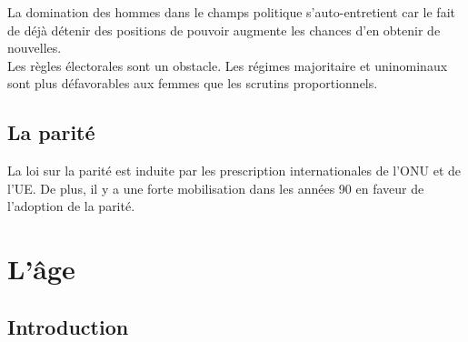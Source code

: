 \documentclass[10pt, a4paper, openany]{book}
\begin{document}
La domination des hommes dans le champs politique s'auto-entretient car le fait de déjà détenir des positions de pouvoir augmente les chances d'en obtenir de nouvelles. \\
Les règles électorales sont un obstacle. Les régimes majoritaire et uninominaux sont plus défavorables aux femmes que les scrutins proportionnels. 

\section{La parité}

La loi sur la parité est induite par les prescription internationales de l'ONU et de l'UE. De plus, il y a une forte mobilisation dans les années 90 en faveur de l'adoption de la parité. 


\chapter{L'âge}

\section{Introduction}
\end{document}

